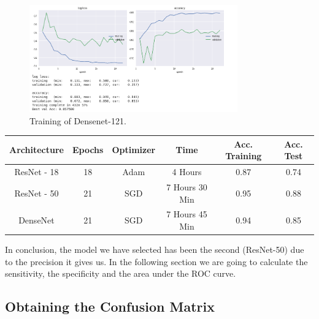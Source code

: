 \begin{figure}[H]
\centering
\includegraphics[width=0.8\textwidth]{./figures/densenet-121}
\caption{Training of Densenet-121.}
\end{figure}


\begin{table}[H]
\begin{tabular}{@{}cccccc@{}}
\toprule
\textbf{Architecture} & \textbf{Epochs} & \textbf{Optimizer} & \textbf{Time}  & \textbf{Acc. Training} & \textbf{Acc. Test} \\ \midrule
ResNet - 18           & 18              & Adam               & 4 Hours        & 0.87                   & 0.74               \\
ResNet - 50           & 21              & SGD                & 7 Hours 30 Min & 0.95                   & 0.88               \\
DenseNet              & 21              & SGD                & 7 Hours 45 Min & 0.94                   & 0.85               \\ \bottomrule
\end{tabular}
\end{table}


In conclusion, the model we have selected has been the second (ResNet-50) due to the precision it gives us. In the following section we are going to calculate the sensitivity, the specificity and the area under the ROC curve.

\subsection{Obtaining the Confusion Matrix}

